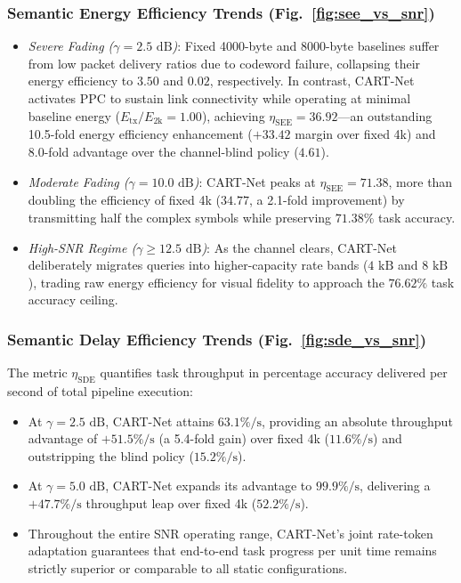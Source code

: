\subsubsection{Semantic Energy Efficiency Trends (Fig.~\ref{fig:see_vs_snr})}
\begin{itemize}
    \item \textit{Severe Fading ($\gamma = 2.5\text{ dB}$)}: Fixed 4000-byte and 8000-byte baselines suffer from low packet delivery ratios due to codeword failure, collapsing their energy efficiency to $3.50$ and $0.02$, respectively. In contrast, CART-Net activates PPC to sustain link connectivity while operating at minimal baseline energy ($E_{\mathrm{tx}} / E_{2\mathrm{k}} = 1.00$), achieving $\eta_{\mathrm{SEE}} = 36.92$---an outstanding 10.5-fold energy efficiency enhancement ($+33.42$ margin over fixed 4k) and 8.0-fold advantage over the channel-blind policy ($4.61$).
    \item \textit{Moderate Fading ($\gamma = 10.0\text{ dB}$)}: CART-Net peaks at $\eta_{\mathrm{SEE}} = 71.38$, more than doubling the efficiency of fixed 4k ($34.77$, a 2.1-fold improvement) by transmitting half the complex symbols while preserving $71.38\%$ task accuracy.
    \item \textit{High-SNR Regime ($\gamma \ge 12.5\text{ dB}$)}: As the channel clears, CART-Net deliberately migrates queries into higher-capacity rate bands ($4\text{ kB}$ and $8\text{ kB}$), trading raw energy efficiency for visual fidelity to approach the $76.62\%$ task accuracy ceiling.
\end{itemize}

\subsubsection{Semantic Delay Efficiency Trends (Fig.~\ref{fig:sde_vs_snr})}
The metric $\eta_{\mathrm{SDE}}$ quantifies task throughput in percentage accuracy delivered per second of total pipeline execution:
\begin{itemize}
    \item At $\gamma = 2.5\text{ dB}$, CART-Net attains $63.1\%/\text{s}$, providing an absolute throughput advantage of $+51.5\%/\text{s}$ (a 5.4-fold gain) over fixed 4k ($11.6\%/\text{s}$) and outstripping the blind policy ($15.2\%/\text{s}$).
    \item At $\gamma = 5.0\text{ dB}$, CART-Net expands its advantage to $99.9\%/\text{s}$, delivering a $+47.7\%/\text{s}$ throughput leap over fixed 4k ($52.2\%/\text{s}$).
    \item Throughout the entire SNR operating range, CART-Net's joint rate-token adaptation guarantees that end-to-end task progress per unit time remains strictly superior or comparable to all static configurations.
\end{itemize}

